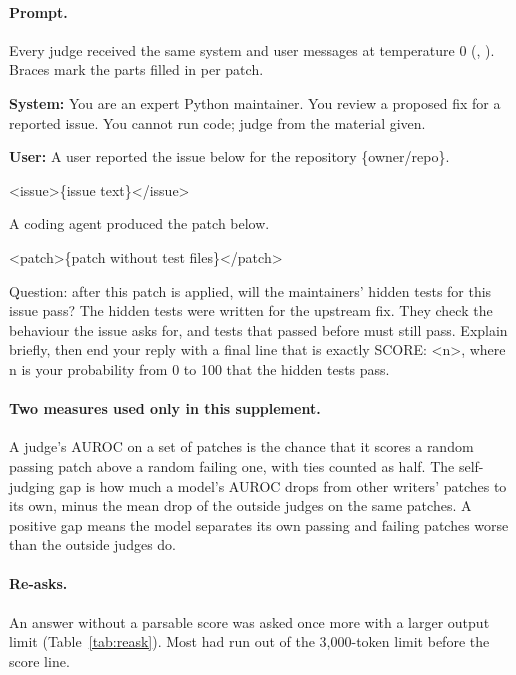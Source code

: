 \documentclass[10pt,letterpaper]{article}
\begin{document}
\paragraph{Prompt.} Every judge received the same system and user messages at temperature 0
(, ). Braces mark the parts filled in per patch.
\begin{promptbox}\ttfamily
\textbf{System:} You are an expert Python maintainer. You review a proposed fix for a reported issue. You cannot run
code; judge from the material given.\par\medskip
\textbf{User:} A user reported the issue below for the repository \{owner/repo\}.\par
<issue>\{issue text\}</issue>\par
A coding agent produced the patch below.\par
<patch>\{patch without test files\}</patch>\par
Question: after this patch is applied, will the maintainers' hidden tests for this issue pass? The hidden tests were
written for the upstream fix. They check the behaviour the issue asks for, and tests that passed before must still
pass. Explain briefly, then end your reply with a final line that is exactly SCORE: <n>, where n is your probability
from 0 to 100 that the hidden tests pass.
\end{promptbox}

\paragraph{Two measures used only in this supplement.} A judge's AUROC on a set of patches is the chance that it
scores a random passing patch above a random failing one, with ties counted as half. The self-judging gap is how much
a model's AUROC drops from other writers' patches to its own, minus the mean drop of the outside judges on the same
patches. A positive gap means the model separates its own passing and failing patches worse than the outside judges
do.

\paragraph{Re-asks.} An answer without a parsable score was asked once more with a larger output limit
(Table~\ref{tab:reask}). Most had run out of the 3,000-token limit before the score line.
\end{document}
